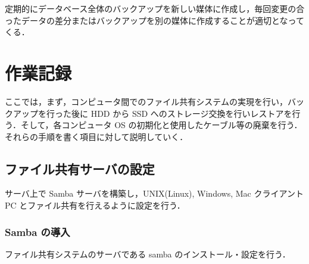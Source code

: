 \documentclass[a4j,titlepage]{jarticle}
\begin{document}
定期的にデータベース全体のバックアップを新しい媒体に作成し，毎回変更の合ったデータの差分またはバックアップを別の媒体に作成することが適切となってくる．

\section{作業記録}
ここでは，まず，コンピュータ間でのファイル共有システムの実現を行い，バックアップを行った後に HDD から SSD へのストレージ交換を行いレストアを行う．そして，各コンピュータ OS の初期化と使用したケーブル等の廃棄を行う．それらの手順を書く項目に対して説明していく．

\subsection{ファイル共有サーバの設定}
サーバ上で Samba サーバを構築し，UNIX(Linux), Windows, Mac クライアントPC とファイル共有を行えるように設定を行う．

\subsubsection{Samba の導入}
ファイル共有システムのサーバである samba のインストール・設定を行う．
\end{document}
